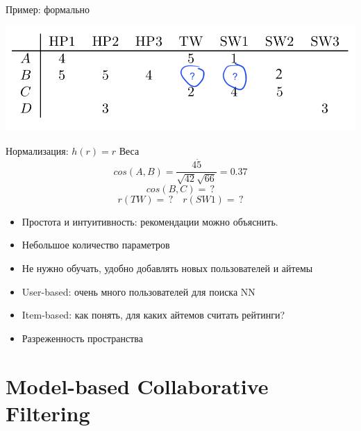 \documentclass[11pt,aspectratio=169]{beamer}
\begin{document}
\begin{frame}{Пример: формально}

\begin{center}
\includegraphics[scale=0.5]{images/utility.png}
\end{center}

Нормализация: $h(r) = r$
Веса
\[
cos(A, B) = \frac{4 \dot 5}{ \sqrt{42} \sqrt{66} } = 0.37
\]
\[
cos(B, C) = \, ? 
\]
\[
r(TW) = \, ? \quad r(SW1) = \, ?
\]

\end{frame}

\begin{frame}{}

\begin{tcolorbox}[colback=info!5,colframe=info!80,title=Плюсы]
  \begin{itemize}
    \item Простота и интуитивность: рекомендации можно объяснить.
    \item Небольшое количество параметров
    \item Не нужно обучать, удобно добавлять новых пользователей и айтемы
  \end{itemize}
\end{tcolorbox}

\begin{tcolorbox}[colback=warn!5,colframe=warn!80,title=Минусы]
  \begin{itemize}
    \item User-based: очень много пользователей для поиска NN
    \item Item-based: как понять, для каких айтемов считать рейтинги?
    \item Разреженность пространства
  \end{itemize}
\end{tcolorbox}

\end{frame}

\section{Model-based Collaborative Filtering}
\end{document}
